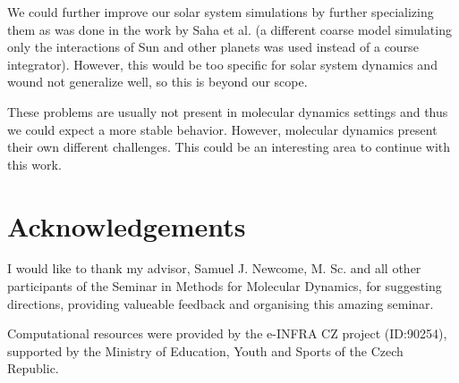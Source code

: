 \documentclass[conference]{IEEEtran}
\begin{document}
We could further improve our solar system simulations by further specializing them as was done in the work by Saha et al. \cite{parallelsolar} (a different coarse model simulating only the interactions of Sun and other planets was used instead of a course integrator). However, this would be too specific for solar system dynamics and wound not generalize well, so this is beyond our scope.

These problems are usually not present in molecular dynamics settings and thus we could expect a more stable behavior. However, molecular dynamics present their own different challenges. This could be an interesting area to continue with this work.


\section*{Acknowledgements}

I would like to thank my advisor, Samuel J. Newcome, M. Sc. and all other participants of the Seminar in Methods for Molecular Dynamics, for suggesting directions, providing valueable feedback and organising this amazing seminar.

Computational resources were provided by the e-INFRA CZ project (ID:90254),
supported by the Ministry of Education, Youth and Sports of the Czech Republic.
\end{document}
